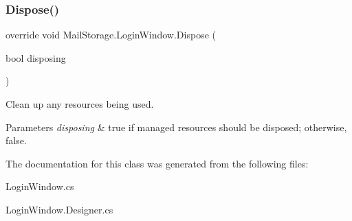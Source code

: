 \subsubsection{\texorpdfstring{Dispose()}{Dispose()}}
{\footnotesize\ttfamily override void Mail\+Storage.\+Login\+Window.\+Dispose (\begin{DoxyParamCaption}\item[{bool}]{disposing }\end{DoxyParamCaption})\hspace{0.3cm}{\ttfamily [protected]}}



Clean up any resources being used. 


\begin{DoxyParams}{Parameters}
{\em disposing} & true if managed resources should be disposed; otherwise, false.\\
\hline
\end{DoxyParams}


The documentation for this class was generated from the following files\+:\begin{DoxyCompactItemize}
\item 
Login\+Window.\+cs\item 
Login\+Window.\+Designer.\+cs\end{DoxyCompactItemize}
